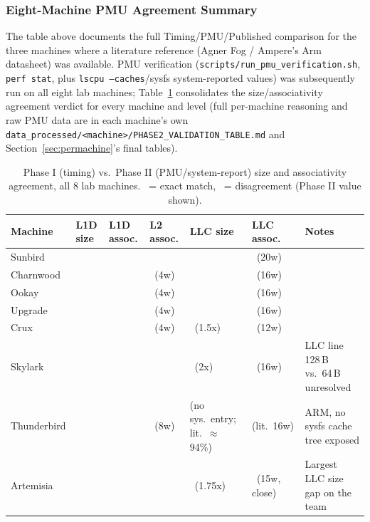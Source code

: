 \documentclass{article}
\newcommand{\cmark}{\ding{51}}
\newcommand{\xmark}{\ding{55}}
\begin{document}
\subsubsection{Eight-Machine PMU Agreement Summary}

The table above documents the full Timing/PMU/Published comparison for the three machines
where a literature reference (Agner Fog / Ampere's Arm datasheet) was available. PMU
verification (\texttt{scripts/run\_pmu\_verification.sh}, \texttt{perf stat}, plus
\texttt{lscpu --caches}/sysfs system-reported values) was subsequently run on all eight lab
machines; Table~\ref{tab:phase2-summary} consolidates the size/associativity agreement
verdict for every machine and level (full per-machine reasoning and raw PMU data are in each
machine's own \texttt{data\_processed/<machine>/PHASE2\_VALIDATION\_TABLE.md} and
Section~\ref{sec:permachine}'s final tables).

\begin{table}[H]
\centering\scriptsize
\caption{Phase I (timing) vs.\ Phase II (PMU/system-report) size and associativity agreement, all 8 lab machines. \cmark\ = exact match, \xmark\ = disagreement (Phase II value shown).}
\label{tab:phase2-summary}
\begin{tabularx}{\textwidth}{|l|l|l|l|X|l|X|}
\hline
Machine & L1D size & L1D assoc. & L2 assoc. & LLC size & LLC assoc. & Notes\\
\hline
Sunbird & \cmark & \cmark & \cmark & \cmark & \xmark\ (20w) & \\
Charnwood & \cmark & \cmark & \xmark\ (4w) & \cmark & \xmark\ (16w) & \\
Ookay & \cmark & \cmark & \xmark\ (4w) & \cmark & \xmark\ (16w) & \\
Upgrade & \cmark & \cmark & \xmark\ (4w) & \cmark & \xmark\ (16w) & \\
Crux & \cmark & \cmark & \xmark\ (4w) & \xmark\ (1.5x) & \xmark\ (12w) & \\
Skylark & \cmark & \cmark & \cmark & \xmark\ (2x) & \xmark\ (16w) & LLC line 128\,B vs.\ 64\,B unresolved\\
Thunderbird & \cmark & \cmark & \xmark\ (8w) & (no sys.\ entry; lit.\ $\approx$94\%) & (lit.\ 16w) & ARM, no sysfs cache tree exposed\\
Artemisia & \cmark & \cmark & \cmark & \xmark\ (1.75x) & \xmark\ (15w, close) & Largest LLC size gap on the team\\
\hline
\end{tabularx}
\end{table}
\end{document}
